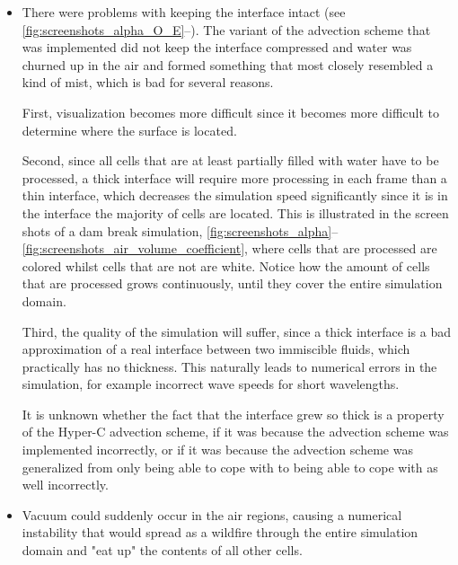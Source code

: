 \begin{itemize}
    \item There were problems with keeping the interface intact (see \figrefs \mbox{\ref{fig:screenshots_alpha_O_E}--}). The variant of the  advection scheme that was implemented did not keep the interface compressed and water was churned up in the air and formed something that most closely resembled a kind of mist, which is bad for several reasons.
    
    First, visualization becomes more difficult since it becomes more difficult to determine where the surface is located.
    
    Second, since all cells that are at least partially filled with water have to be processed, a thick interface will require more processing in each frame than a thin interface, which decreases the simulation speed significantly since it is in the interface the majority of cells are located. This is illustrated in the screen shots of a dam break simulation, \figrefs \ref{fig:screenshots_alpha}--\ref{fig:screenshots_air_volume_coefficient}, where cells that are processed are colored whilst cells that are not are white. Notice how the amount of cells that are processed grows continuously, until they cover the entire simulation domain.
    
    Third, the quality of the simulation will suffer, since a thick interface is a bad approximation of a real interface between two immiscible fluids, which practically has no thickness. This naturally leads to numerical errors in the simulation, for example incorrect wave speeds for short wavelengths.
    
    It is unknown whether the fact that the interface grew so thick is a property of the Hyper-C advection scheme, if it was because the advection scheme was implemented incorrectly, or if it was because the advection scheme was generalized from only being able to cope with  to being able to cope with  as well incorrectly.%
    \item Vacuum could suddenly occur in the air regions, causing a numerical instability that would spread as a wildfire through the entire simulation domain and "eat up" the contents of all other cells.
    

\end{itemize}
